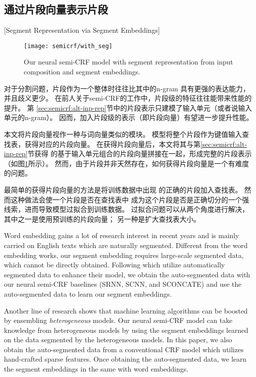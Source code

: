 \subsection{通过片段向量表示片段}[Segment Representation via Segment Embeddings]\label{sec:semicrf:seg-rep}
\begin{figure}[t]
	\centering
	\texttt{[image: semicrf/with\_seg]}
	\caption{Our neural semi-CRF model with segment representation from input composition and segment embeddings.}\label{fig:semicrf:with-seg}
\end{figure}

对于分割问题，片段作为一个整体时往往比其中的n-gram
具有更强的表达能力，并且歧义更少。
在前人关于semi-CRF的工作中，片段级的特征往往能带来性能的提升。
第 \ref{sec:semicrf:alt-inp-rep}节中的片段表示只建模了输入单元（或者说输入单元的n-gram）。
因而，加入片段级的表示（即片段向量）有望进一步提升性能。

本文将片段向量视作一种与词向量类似的模块。
模型将整个片段作为键值输入查找表，获得对应的片段向量。
在获得片段向量后，本文将其与第\ref{sec:semicrf:alt-inp-rep}节获得
的基于输入单元组合的片段向量拼接在一起，形成完整的片段表示（如图\ref{fig:semicrf:with-seg}所示）。
然而，由于片段并非天然存在，如何获得片段向量是一个有难度的问题。

最简单的获得片段向量的方法是将训练数据中出现
的正确的片段加入查找表。
然而这种做法会使一个片段是否在查找表中
成为这个片段是否是正确切分的一个强线索，进而导致模型过拟合到训练数据。
过拟合问题可以从两个角度进行解决，
其中之一是使用预训练的片段向量\cite{Erhan:2010:WUP:1756006.1756025}；
另一种是扩大查找表大小。

Word embedding gains a lot of research interest in recent years \cite{DBLP:journals/corr/MikolovSCCD13} and is mainly carried on English texts which are naturally segmented.
Different from the word embedding works, our segment embedding requires large-scale segmented data, which cannot be directly obtained.
Following \cite{wang-EtAl:2011:IJCNLP-2011} which utilize automatically segmented data to enhance their model, we obtain the auto-segmented data with our neural semi-CRF baselines (SRNN, SCNN, and SCONCATE) and use the auto-segmented data to learn our segment embeddings.

Another line of research shows that machine learning algorithms can be boosted by ensembling {\it heterogeneous} models.
Our neural semi-CRF model can take knowledge from heterogeneous models by using the segment embeddings learned on the data segmented by the heterogeneous models.
In this paper, we also obtain the auto-segmented data from a conventional CRF model which utilizes hand-crafted sparse features.
Once obtaining the auto-segmented data, we learn the segment embeddings in the same with word embeddings.

